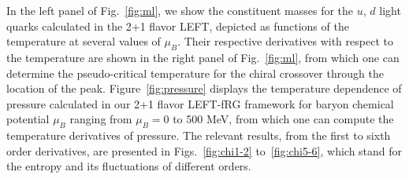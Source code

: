 \documentclass[aps,twocolumn,prd,superscriptaddress,nofootinbib,floatfix]{revtex4-2}
\begin{document}
In the left panel of Fig.~\ref{fig:ml}, we show the constituent masses for the $u$, $d$ light quarks calculated in the 2+1 flavor LEFT, depicted as functions of the temperature at several values of $\mu_B$. Their respective derivatives with respect to the temperature are shown in the right panel of Fig.~\ref{fig:ml}, from which one can determine the pseudo-critical temperature for the chiral crossover through the location of the peak. Figure~\ref{fig:pressure} displays the temperature dependence of pressure calculated in our 2+1 flavor LEFT-fRG framework for baryon chemical potential $\mu_B$ ranging from $\mu_B=0$ to 500 MeV, from which one can compute the temperature derivatives of pressure. The relevant results, from the first to sixth order derivatives, are presented in Figs.~\ref{fig:chi1-2} to~\ref{fig:chi5-6}, which stand for the entropy and its fluctuations of different orders.
\end{document}
